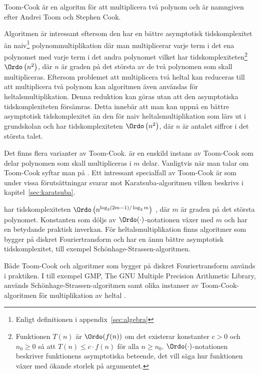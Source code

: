 Toom-Cook är en algoritm för att multiplicera två polynom och är namngiven efter
Andrei Toom och Stephen Cook.

Algoritmen är intressant eftersom den har en bättre asymptotisk tidskomplexitet
än naiv\footnote{Enligt definitionen i appendix~\ref{sec:algebra}}
polynommultiplikation där man multiplicerar varje term i det ena polynomet med
varje term i det andra polynomet vilket har
tidskomplexiteten\footnote{Funktionen $T(n)$ är $\Ordo(f(n))$ om det existerar
konstanter $c > 0$ och $n_0 \geq 0$ så att $T(n) \leq c \cdot f(n)$ för alla $n
\geq n_0$. $\Ordo(\cdot )$-notationen beskriver funktionens asymptotiska
beteende, det vill säga hur funktionen växer med ökande storlek på argumentet.}
$\Ordo\left(n^2\right)$, där $n$ är graden på det största av de två polynomen
som skall multipliceras. Eftersom problemet att multiplicera två heltal kan
reduceras till att multiplicera två polynom kan algoritmen även användas för
heltalsmultiplikation. Denna reduktion kan göras utan att den asymptotiska
tidskomplexiteten försämras. Detta innebär att man kan uppnå en bättre
asymptotisk tidskomplexitet än den för naiv heltalsmultiplikation som lärs ut i
grundskolan och har tidskomplexiteten $\Ordo\left(n^2\right)$, där $n$ är
antalet siffror i det största talet.

Det finns flera varianter av Toom-Cook.  är en enskild instans av
Toom-Cook som delar polynomen som skall multipliceras i $m$ delar. Vanligtvis
när man talar om Toom-Cook syftar man på . Ett intressant specialfall
av Toom-Cook är  som under vissa förutsättningar svarar mot
Karatsuba-algoritmen vilken beskrivs i kapitel~\ref{sec:karatsuba}.

 har tidskomplexiteten $\Ordo \left(n^{\log_2(2 m-1)/\log_2 m}\right)$
\cite{bodrato2007towards}, där $m$ är graden på det största polynomet.
Konstanten som döljs av $\Ordo(\cdot)$-notationen växer med $m$ och har en
betydande praktisk inverkan. För heltalsmultiplikation finns algoritmer som
bygger på diskret Fouriertransform och har en ännu bättre asymptotisk
tidskomplexitet, till exempel Schönhage-Strassen-algoritmen.

Både Toom-Cook och algoritmer som bygger på diskret Fouriertransform används i
praktiken. I till exempel GMP, The GNU Multiple Precision Arithmetic Library,
används Schönhage-Strassen-algoritmen samt olika instanser av
Toom-Cook-algoritmen för multiplikation av heltal \cite{gmpdoc}.
